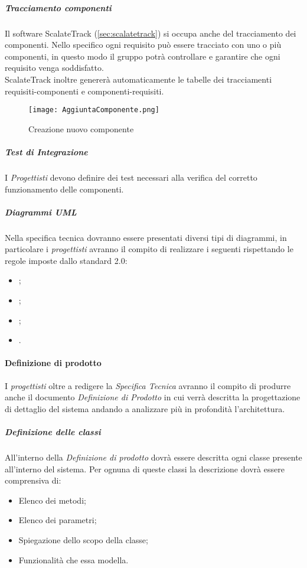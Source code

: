 \documentclass{scalatekids-article}
\begin{document}
\subparagraph{Tracciamento componenti}

Il software ScalateTrack (\ref{sec:scalatetrack}) si occupa anche del
tracciamento dei componenti. Nello specifico ogni requisito può essere tracciato
con uno o più componenti, in questo modo il gruppo potrà controllare e garantire
che ogni requisito venga soddisfatto.\\ ScalateTrack inoltre genererà
automaticamente le tabelle dei tracciamenti requisiti-componenti e
componenti-requisiti.

\begin{figure}[H]
  \centering
  \texttt{[image: AggiuntaComponente.png]}
  \caption{Creazione nuovo componente}
\end{figure}

\subparagraph{Test di Integrazione}

I \textit{Progettisti} devono definire dei test necessari alla verifica del
corretto funzionamento delle componenti.

\subparagraph{Diagrammi UML}
\label{sec:diagrammiUmlSpecTec}
Nella specifica tecnica dovranno essere presentati diversi tipi di diagrammi, in
particolare i \textit{progettisti} avranno il compito di realizzare i seguenti
rispettando le regole imposte dallo standard 
2.0: %
\begin{itemize}
\item {};
\item {};
\item {};
\item {}.
\end{itemize}

\paragraph{Definizione di prodotto}
I \textit{progettisti} oltre a redigere la \textit{Specifica Tecnica} avranno il compito di
produrre anche il documento \textit{Definizione di Prodotto} in cui verrà descritta
la progettazione di dettaglio del sistema andando a analizzare più in profondità
l'architettura.

\subparagraph{Definizione delle classi}
All'interno della \textit{Definizione di prodotto} dovrà essere descritta ogni
classe presente all'interno del sistema. Per ognuna di queste classi la descrizione
dovrà essere comprensiva di:
\begin{itemize}
\item Elenco dei metodi;
\item Elenco dei parametri;
\item Spiegazione dello scopo della classe;
\item Funzionalità che essa modella.
\end{itemize}
\end{document}
